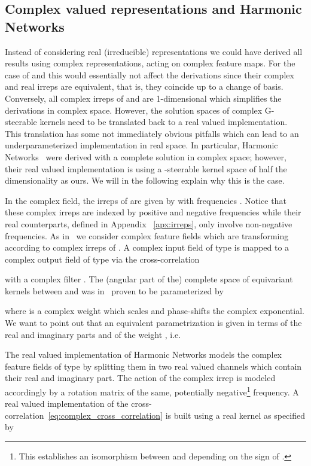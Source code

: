 \documentclass{article}
\newcommand{\apx}{Appendix\xspace
}
\begin{document}
{{\subsection{Complex valued representations and Harmonic Networks}
\label{apx:incompleteness_hnets}


Instead of considering real (irreducible) representations we could have derived all results using complex representations, acting on complex feature maps.
For the case of  and  this would essentially not affect the derivations since their complex and real irreps are equivalent, that is, they coincide up to a change of basis.
Conversely, all complex irreps of  and  are 1-dimensional which simplifies the derivations in complex space.
However, the solution spaces of complex G-steerable kernels need to be translated back to a real valued implementation.
This translation has some not immediately obvious pitfalls which can lead to an underparameterized implementation in real space.
In particular, Harmonic Networks~\cite{Worrall2017-HNET} were derived with a complete solution in complex space; however, their real valued implementation is using a -steerable kernel space of half the dimensionality as ours.
We will in the following explain why this is the case.

In the complex field, the irreps of  are given by  with frequencies .
Notice that these complex irreps are indexed by positive and negative frequencies while their real counterparts, defined in \apx~\ref{apx:irreps}, only involve non-negative frequencies.
As in~\cite{Worrall2017-HNET} we consider complex feature fields  which are transforming according to complex irreps of .
A complex input  field  of type  is mapped to
a complex output field  of type 
via the cross-correlation

with a complex filter .
The (angular part of the) complete space of equivariant kernels between  and  was in~\cite{Worrall2017-HNET} proven to be parameterized by

where  is a complex weight which scales and phase-shifts the complex exponential.
We want to point out that an equivalent parametrization is given in terms of the real and imaginary parts  and  of the weight , i.e.

The real valued implementation of Harmonic Networks models the complex feature fields  of type  by splitting them in two real valued channels  which contain their real and imaginary part.
The action of the complex irrep  is modeled accordingly by a rotation matrix of the same, potentially negative\footnote{This establishes an isomorphism between  and  depending on the sign of .}
frequency.
A real valued implementation of the cross-correlation~\eqref{eq:complex_cross_correlation} is built using a real kernel  as specified by

}}
\end{document}
